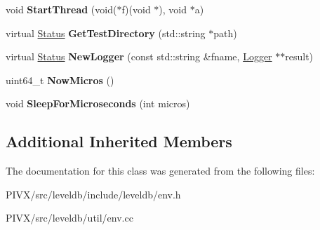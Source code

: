 \begin{DoxyCompactItemize}
\mbox{\label{classleveldb_1_1_env_wrapper_a8c910a8ab40a7f4a6eb7bc41bc39f78b}} 
void {\bfseries Start\+Thread} (void($\ast$f)(void $\ast$), void $\ast$a)
\item 
\mbox{\label{classleveldb_1_1_env_wrapper_a62fdf74a9991e4226091bfdc58e97f16}} 
virtual \mbox{\hyperlink{classleveldb_1_1_status}{Status}} {\bfseries Get\+Test\+Directory} (std\+::string $\ast$path)
\item 
\mbox{\label{classleveldb_1_1_env_wrapper_af065b31ff6876780896be1c8f197e556}} 
virtual \mbox{\hyperlink{classleveldb_1_1_status}{Status}} {\bfseries New\+Logger} (const std\+::string \&fname, \mbox{\hyperlink{classleveldb_1_1_logger}{Logger}} $\ast$$\ast$result)
\item 
\mbox{\label{classleveldb_1_1_env_wrapper_ad3a36da82ba4ca10a34b45f3b9edfeaf}} 
uint64\+\_\+t {\bfseries Now\+Micros} ()
\item 
\mbox{\label{classleveldb_1_1_env_wrapper_a6e05455e32edd8cd4657fc22f4e422e9}} 
void {\bfseries Sleep\+For\+Microseconds} (int micros)
\end{DoxyCompactItemize}
\subsection*{Additional Inherited Members}


The documentation for this class was generated from the following files\+:\begin{DoxyCompactItemize}
\item 
P\+I\+V\+X/src/leveldb/include/leveldb/env.\+h\item 
P\+I\+V\+X/src/leveldb/util/env.\+cc\end{DoxyCompactItemize}
